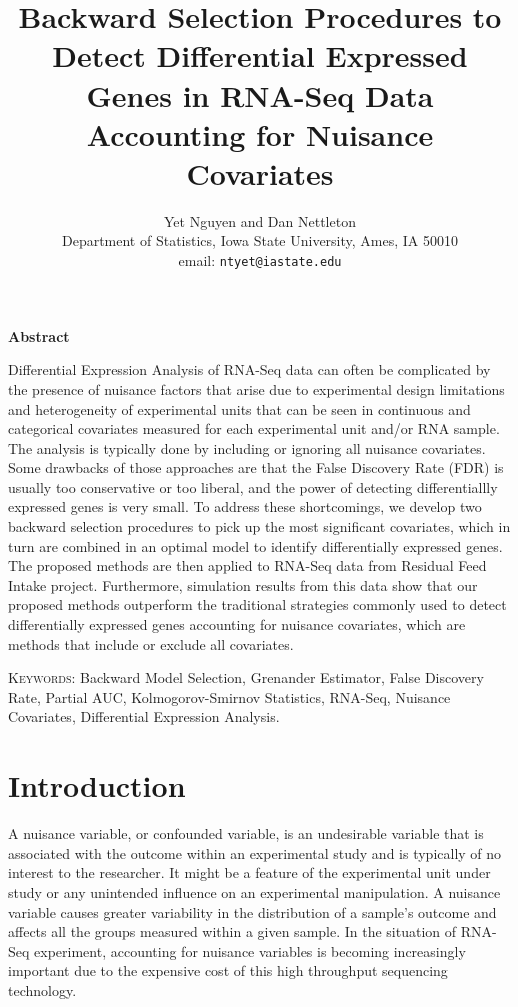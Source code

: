 \documentclass[12pt, letter]{article}\usepackage[]{graphicx}\usepackage[]{color}
\begin{document}
\title{ Backward Selection Procedures to  Detect Differential Expressed Genes in RNA-Seq Data
Accounting for Nuisance Covariates}
\author{Yet Nguyen and Dan Nettleton\\
Department of Statistics, 
Iowa State University, Ames, IA 50010\\ 
email: \texttt{ntyet@iastate.edu}
}

\maketitle



%
\begin{center}
\textbf{Abstract}
\end{center}
Differential Expression Analysis of RNA-Seq data can often be complicated by the presence of nuisance factors that arise due to experimental design limitations and heterogeneity of experimental units that can be seen in continuous and categorical covariates measured for each experimental unit and/or RNA sample. The analysis is typically done by including or ignoring all nuisance covariates. Some drawbacks of those approaches are that the False Discovery Rate (FDR) is usually too conservative or too liberal, and the power of detecting differentiallly expressed genes is very small. To address these shortcomings, we develop two backward selection procedures to pick up the most significant covariates, which in turn are combined in an optimal model  to identify differentially expressed genes. The proposed methods are then applied to RNA-Seq data from Residual Feed Intake project. Furthermore, simulation results from  this data show that our proposed methods outperform the traditional strategies commonly used to detect differentially expressed genes accounting for nuisance covariates, which are methods that include or exclude all covariates.

\vspace*{.3in}

\noindent\textsc{Keywords}: {Backward Model Selection, Grenander Estimator,  False Discovery Rate, Partial AUC, Kolmogorov-Smirnov Statistics, RNA-Seq, Nuisance Covariates, Differential Expression Analysis.}

%

\section{ Introduction}
A nuisance variable, or confounded variable, is an undesirable variable that is associated with the outcome within an experimental study and is typically of no interest to the researcher. It might be a feature of the experimental unit under study or any unintended influence on an experimental manipulation. A nuisance variable causes greater variability in the distribution of a sample's outcome and affects all the groups measured within a given sample. In the situation of RNA-Seq experiment, accounting for nuisance variables is becoming increasingly important due to the expensive cost of this high throughput sequencing technology.
\end{document}
